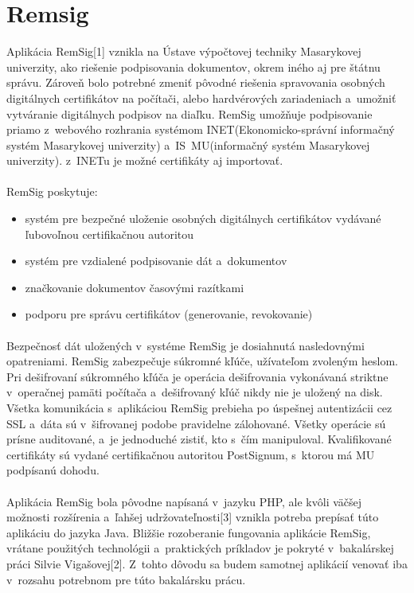 \documentclass[
  digital, %
  table,   %
oneside,
  nolof,     %
  nolot,     %
]{fithesis3}
\begin{document}
\section{Remsig}
Aplikácia RemSig[1] vznikla na Ústave výpočtovej techniky Masarykovej univerzity, ako riešenie podpisovania dokumentov, okrem iného aj pre štátnu správu. Zároveň bolo potrebné zmeniť pôvodné riešenia spravovania osobných digitálnych certifikátov na počítači, alebo hardvérových zariadeniach a~umožniť vytváranie digitálnych podpisov na diaľku. RemSig umožňuje podpisovanie priamo z~webového rozhrania systémom INET(Ekonomicko-správní informačný systém Masarykovej univerzity) a~IS~MU(informačný systém Masarykovej univerzity). z~INETu je možné certifikáty aj importovať.\paragraph{}
RemSig poskytuje:
\begin{itemize}
\item systém pre bezpečné uloženie osobných digitálnych certifikátov vydávané ľubovoľnou certifikačnou autoritou
\item systém pre vzdialené podpisovanie dát a~dokumentov
\item značkovanie dokumentov časovými razítkami 
\item podporu pre správu certifikátov (generovanie, revokovanie)

 \end{itemize}

\paragraph{}
Bezpečnosť dát uložených v~systéme RemSig je dosiahnutá nasledovnými opatreniami. RemSig zabezpečuje súkromné kľúče, užívateľom zvoleným heslom. Pri dešifrovaní súkromného kľúča je operácia dešifrovania vykonávaná striktne v~operačnej pamäti počítača a~dešifrovaný kľúč nikdy nie je uložený na disk. Všetka komunikácia s~aplikáciou RemSig prebieha po úspešnej autentizácii cez SSL a~dáta sú v~šifrovanej podobe pravidelne zálohované. Všetky operácie sú prísne auditované, a~je jednoduché zistiť, kto s~čím manipuloval. Kvalifikované certifikáty sú vydané certifikačnou autoritou PostSignum, s~ktorou má MU podpísanú dohodu.
\paragraph{}
Aplikácia RemSig bola pôvodne napísaná v~jazyku PHP, ale kvôli väčšej možnosti rozšírenia a~ľahšej udržovateľnosti[3] vznikla potreba prepísať túto aplikáciu do jazyka Java.  Bližšie rozoberanie fungovania aplikácie RemSig, vrátane použitých technológii a~praktických príkladov je pokryté v~bakalárskej práci Silvie Vigašovej[2]. Z~tohto dôvodu sa budem samotnej aplikácií venovať iba v~rozsahu potrebnom pre túto bakalársku prácu.
\end{document}
